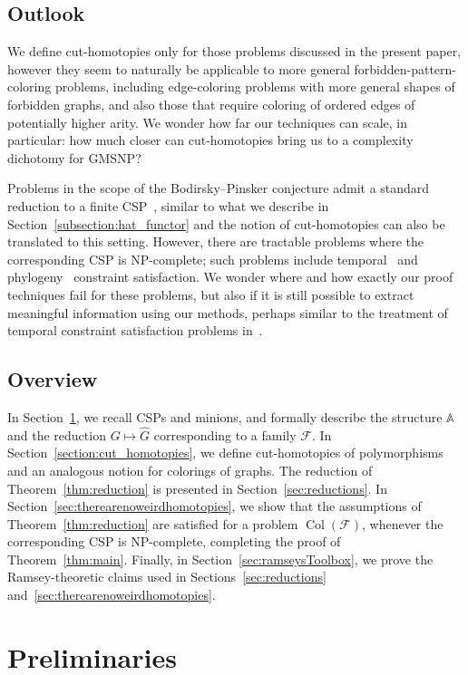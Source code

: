 \documentclass[oneside]{amsart}
\DeclareMathOperator{\col}{Col}
\newcommand{\str}[1]{\mathbb{#1}}
\newcommand{\cat}[1]{\mathcal{#1}}
\begin{document}
\subsection{Outlook}
We define cut-homotopies only for
those
problems discussed in the present paper, however they seem to naturally be applicable to more general forbidden-pattern-coloring problems, including edge-coloring problems with more general shapes of forbidden graphs, and also those that require coloring of ordered edges of potentially higher arity.
We wonder how far our techniques can scale, in particular: how much closer can cut-homotopies bring us to a  complexity dichotomy for GMSNP? 

Problems in the scope of the Bodirsky--Pinsker conjecture admit a standard reduction to a finite CSP~\cite{CSPsOrbitReduction}, similar to what we describe in Section~\ref{subsection:hat_functor} and the notion of cut-homotopies
can also be translated to this setting. However, there are tractable problems where the corresponding CSP is NP-complete; such problems include temporal~\cite{TemporalCSPs} and phylogeny~\cite{PhyloCSPs} constraint satisfaction.
We wonder where and how exactly our proof techniques fail for these problems,
but also if it is still possible to extract meaningful information
using our methods, perhaps similar to the treatment of temporal constraint satisfaction problems in~\cite{SmoothApproximations}.

\subsection{Overview}
In Section~\ref{section:preliminaries}, we recall CSPs and minions, and formally describe the structure $\str A$ and the reduction $G\mapsto\hat G$ corresponding to a family $\cat F$. 
In Section~\ref{section:cut_homotopies}, we define cut-homotopies of polymorphisms and an analogous notion for colorings of graphs. 
The reduction of Theorem~\ref{thm:reduction} is presented in Section~\ref{sec:reductions}.
In Section~\ref{sec:therearenoweirdhomotopies}, we show that the assumptions of Theorem~\ref{thm:reduction} are satisfied for a problem $\col(\cat F)$, whenever the corresponding CSP is NP-complete, completing the proof of Theorem~\ref{thm:main}.
Finally, in Section~\ref{sec:ramseysToolbox}, we prove the Ramsey-theoretic claims used in Sections~\ref{sec:reductions} and~\ref{sec:therearenoweirdhomotopies}.


\section{Preliminaries}\label{section:preliminaries}
\end{document}
